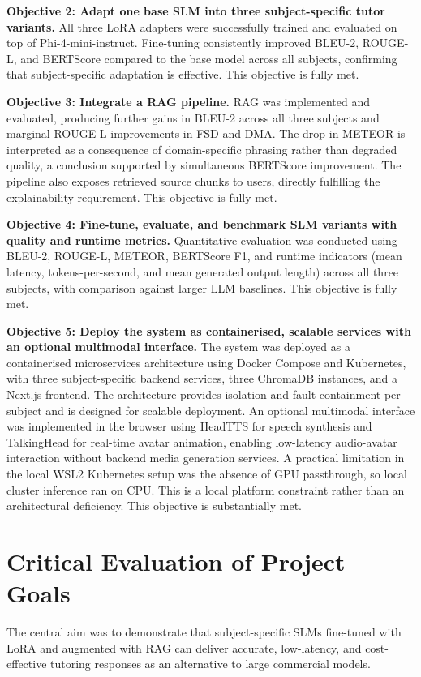 \textbf{Objective 2: Adapt one base SLM into three subject-specific tutor variants.} All three LoRA adapters were successfully trained and evaluated on top of Phi-4-mini-instruct. Fine-tuning consistently improved BLEU-2, ROUGE-L, and BERTScore compared to the base model across all subjects, confirming that subject-specific adaptation is effective. This objective is fully met.

\textbf{Objective 3: Integrate a RAG pipeline.} RAG was implemented and evaluated, producing further gains in BLEU-2 across all three subjects and marginal ROUGE-L improvements in FSD and DMA. The drop in METEOR is interpreted as a consequence of domain-specific phrasing rather than degraded quality, a conclusion supported by simultaneous BERTScore improvement. The pipeline also exposes retrieved source chunks to users, directly fulfilling the explainability requirement. This objective is fully met.

\textbf{Objective 4: Fine-tune, evaluate, and benchmark SLM variants with quality and runtime metrics.} Quantitative evaluation was conducted using BLEU-2, ROUGE-L, METEOR, BERTScore F1, and runtime indicators (mean latency, tokens-per-second, and mean generated output length) across all three subjects, with comparison against larger LLM baselines. This objective is fully met.

\textbf{Objective 5: Deploy the system as containerised, scalable services with an optional multimodal interface.} The system was deployed as a containerised microservices architecture using Docker Compose and Kubernetes, with three subject-specific backend services, three ChromaDB instances, and a Next.js frontend. The architecture provides isolation and fault containment per subject and is designed for scalable deployment. An optional multimodal interface was implemented in the browser using HeadTTS for speech synthesis and TalkingHead for real-time avatar animation, enabling low-latency audio-avatar interaction without backend media generation services. A practical limitation in the local WSL2 Kubernetes setup was the absence of GPU passthrough, so local cluster inference ran on CPU. This is a local platform constraint rather than an architectural deficiency. This objective is substantially met.


\section{Critical Evaluation of Project Goals}

The central aim was to demonstrate that subject-specific SLMs fine-tuned with LoRA and augmented with RAG can deliver accurate, low-latency, and cost-effective tutoring responses as an alternative to large commercial models.

